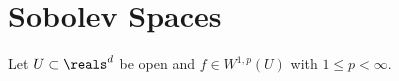 \chapter{Sobolev Spaces}

\begin{thm}\label{LocalApproximationOfSobolevFunctions}Let $U \subset \reals^d$ be open and $f \in W^{1,p}(U)$ with $1 \leq p < \infty$.  
\end{thm}
